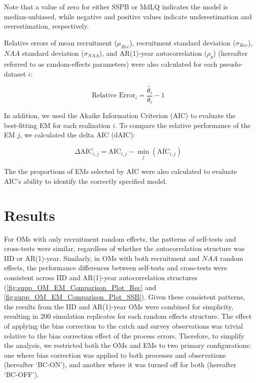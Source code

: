 \documentclass[
  12pt,
]{article}
\begin{document}
Note that a value of zero for either SSPB or MdLQ indicates the model is
median-unbiased, while negative and positive values indicate
underestimation and overestimation, respectively.

Relative errors of mean recruitment (\(\mu_{Rec}\)), recruitment
standard deviation (\(\sigma_{Rec}\)), \(NAA\) standard deviation
(\(\sigma_{NAA}\)), and AR(1)-year autocorrelation (\(\rho_{y}\))
(hereafter referred to as random-effects parameters) were also
calculated for each pseudo-dataset \(i\):

\begin{equation}
\text{Relative Error}_{i} = \frac{\hat{\theta}_{i}}{\theta_{i}} - 1
\end{equation}

In addition, we used the Akaike Information Criterion (AIC) to evaluate
the best-fitting EM for each realization \(i\). To compare the relative
performance of the EM \(j\), we calculated the delta AIC (dAIC):

\begin{equation}
\Delta\text{AIC}_{i,j} = \text{AIC}_{i,j} - \min_{j}(\text{AIC}_{i,j})
\end{equation}

The the proportions of EMs selected by AIC were also calculated to
evaluate AIC's ability to identify the correctly specified model.

\hypertarget{results}{%
\section{Results}\label{results}}

For OMs with only recruitment random effects, the patterns of self-tests
and cross-tests were similar, regardless of whether the autocorrelation
structure was IID or AR(1)-year. Similarly, in OMs with both recruitment
and \(NAA\) random effects, the performance differences between
self-tests and cross-tests were consistent across IID and AR(1)-year
autocorrelation structures (\autoref{fig:supp_OM_EM_Comparison_Plot_Rec}
and \autoref{fig:supp_OM_EM_Comparison_Plot_SSB}). Given these
consistent patterns, the results from the IID and AR(1)-year OMs were
combined for simplicity, resulting in 200 simulation replicates for each
random effects structure. The effect of applying the bias correction to
the catch and survey observations was trivial relative to the bias
correction effect of the process errors. Therefore, to simplify the
analysis, we restricted both the OMs and EMs to two primary
configurations: one where bias correction was applied to both processes
and observations (hereafter `BC-ON'), and another where it was turned
off for both (hereafter `BC-OFF').
\end{document}

